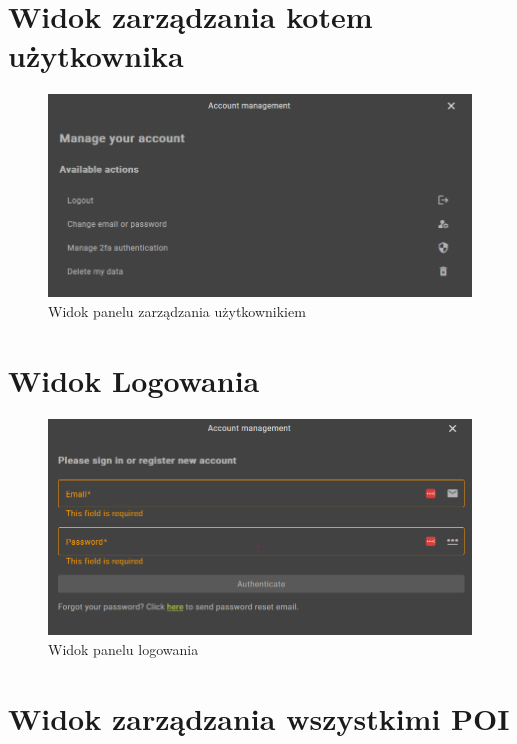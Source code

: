 \section{Widok zarządzania kotem użytkownika}
\label{sec:user}

\begin{figure}[H]
    \centering
    \includegraphics[width=1\textwidth]{attachments/user}
    \caption{Widok panelu zarządzania użytkownikiem}
    \label{fig:user}
\end{figure}

\section{Widok Logowania}
\label{sec:logowanie}

\begin{figure}[H]
    \centering
    \includegraphics[width=1\textwidth]{attachments/logowanie}
    \caption{Widok panelu logowania}
    \label{fig:logowanie}
\end{figure}

\section{Widok zarządzania wszystkimi POI}
\label{sec:manage}

